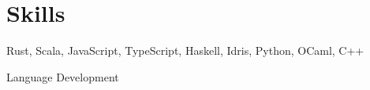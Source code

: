 \section{Skills}

%
{}%
{}%
{}%
{Rust, Scala, JavaScript, TypeScript, Haskell, Idris, Python, OCaml, C++
\newline{}
}

%
{}%
{}%
{}%
{Language Development
\newline{}
}